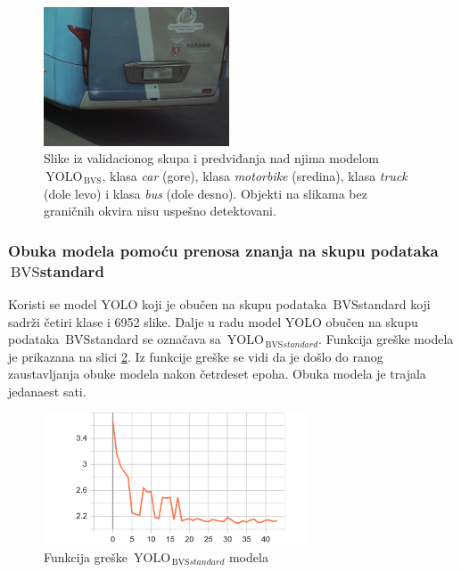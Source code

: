 \documentclass[12pt,oneside]{memoir}
\newcommand{\yolo}{\ensuremath{\,\textrm{YOLO}}}
\newcommand{\bvs}{\ensuremath{\,\textrm{BVS}}}
\begin{document}
\begin{figure}[!htbp]
  \includegraphics[width=0.49\textwidth]{matfmaster/yolo/v4/without_augmentation/bus_0f.jpg}
\caption{Slike iz validacionog skupa i predviđanja nad njima modelom $\yolo_{\bvs}$, klasa \textit{car} (gore), klasa \textit{motorbike} (sredina), klasa \textit{truck} (dole levo) i klasa \textit{bus} (dole desno). Objekti na slikama bez graničnih okvira nisu uspešno detektovani.}
\label{fig:section4_yolo4noaug_images}
\end{figure}



\subsubsection{Obuka modela pomoću prenosa znanja na skupu podataka \bvs{standard}}

Koristi se model YOLO koji je obučen na skupu podataka \bvs{standard} koji sadrži četiri klase i 6952 slike. Dalje u radu model YOLO obučen na skupu podataka \bvs{standard} se označava sa $\yolo_{\bvs{standard}}$. Funkcija greške modela je prikazana na slici \ref{fig:section4_yolov4baseaug_loss}. Iz funkcije greške se vidi da je došlo do ranog zaustavljanja obuke modela nakon četrdeset epoha. Obuka modela je trajala jedanaest sati.



\begin{figure}[!htbp]
\centering
  \includegraphics[width=0.70\textwidth]{matfmaster/yolo/v4/basic_augmentation/epoch_loss.png}
\caption{Funkcija greške  $\yolo_{\bvs{standard}}$ modela}
\label{fig:section4_yolov4baseaug_loss}
\end{figure}
\end{document}
